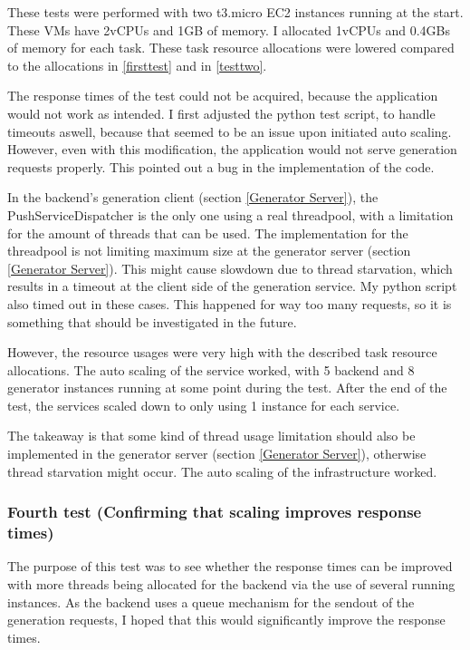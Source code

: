 				These tests were performed with two t3.micro EC2 instances running at the start. 
				These VMs have 2vCPUs and 1GB of memory. I allocated
				1vCPUs and 0.4GBs of memory for each task. 
				These task resource allocations were lowered compared to the allocations in \ref{firsttest} and in \ref{testtwo}.

				The response times of the test could not be acquired, because the application would not work as intended. 
				I first adjusted the python test script, to handle timeouts aswell, because that seemed to be an issue upon initiated 
				auto scaling. However, even with this modification, the application would not serve generation requests properly.
				This pointed out a bug in the implementation of the code.

				In the backend's generation client (section \ref{Generator Server}), the PushServiceDispatcher is the only one using a real threadpool, with a 
				limitation for the amount of threads that can be used. 
				The implementation for the threadpool is not limiting
				maximum size at the generator server (section \ref{Generator Server}). This might cause slowdown due to thread starvation, 
				which results in a timeout at the client side of the generation service.
				My python script also timed out in these cases. This happened for way too many 
				requests, so it is something that should be investigated in the future.

				However, the resource usages were very high with the described task resource allocations. The auto scaling of the service worked,
				with 5 backend and 8 generator instances running at some point during the test. After the end of the test, the services scaled down 
				to only using 1 instance for each service.

				The takeaway is that some kind of thread usage limitation should also be implemented in the generator server (section \ref{Generator Server}),
				otherwise thread starvation might occur. The auto scaling of the infrastructure worked.

			\subsubsection{Fourth test (Confirming that scaling improves response times)}
				The purpose of this test was to see whether the response times can be improved with more threads being allocated for the backend via 
				the use of several running instances.
				As the backend uses a queue mechanism for the sendout of the generation requests, I hoped that this would significantly improve the 
				response times.

